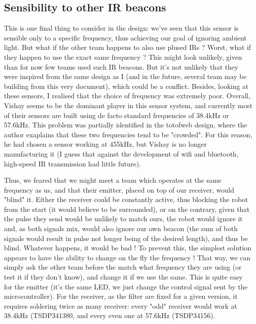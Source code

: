 \documentclass[a4paper,11pt]{article}
\begin{document}
\subsection{Sensibility to other IR beacons}

This is one final thing to consider in the design: we've seen that this sensor is sensible only to a specific frequency, thus achieving our goal of ignoring ambient light. But what if the other team happens to also use plused IRs ? Worst, what if they happen to use the exact same frequency ? This might look unlikely, given than for now few teams used such IR beacons. But it's not unlikely that they were inspired from the same design as I (and in the future, several team may be building from this very document), which could be a conflict. Besides, looking at these sensors, I realised that the choice of frequency was extremely poor. Overall, Vishay seems to be the dominant player in this sensor system, and currently most of their sensors are built using de facto standard frequencies of 38.4kHz or 57.6kHz. This problem was partially identified in the totofweb design, where the author exaplains that these two frequencies tend to be "crowded". For this reason, he had chosen a sensor working at 455kHz, but Vishay is no longer manufacturing it (I guess that against the development of wifi and bluetooth, high-speed IR transmission had little future).

Thus, we feared that we might meet a team which operates at the same frequency as us, and that their emitter, placed on top of our receiver, would "blind" it. Either the receiver could be constantly active, thus blocking the robot from the start (it would believe to be surrounded), or on the contrary, given that the pulse they send would be unlikely to match ours, the robot would ignore it and, as both signals mix, would also ignore our own beacon (the sum of both signals would result in pulse not longer being of the desired length), and thus be blind. Whatever happens, it would be bad ! To prevent this, the simplest solution appears to have the ability to change on the fly the frequency ! That way, we can simply ask the other team before the match what frequency they are using (or test it if they don't know), and change it if we use the same. This is quite easy for the emitter (it's the same LED, we just change the control signal sent by the microcontroller). For the receiver, as the filter are fixed for a given version, it requires soldering twice as many receiver: every "odd" receiver would work at 38.4kHz (TSDP341380, and every even one at 57.6kHz (TSDP34156).
\end{document}
